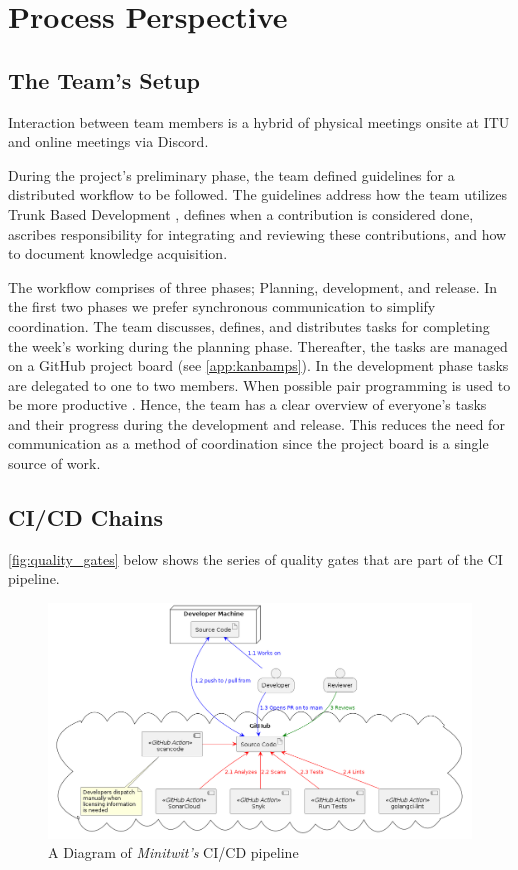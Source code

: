 \section{Process Perspective}

\subsection{The Team's Setup}
Interaction between team members is a hybrid of physical meetings onsite at ITU and online meetings via Discord.  

During the project's preliminary phase, the team defined guidelines for a distributed workflow to be followed. The guidelines address how the team  utilizes Trunk Based Development \cite{trunkdev}, defines when a contribution is considered done, ascribes responsibility for integrating and reviewing these contributions, and how to document knowledge acquisition.

The workflow comprises of three phases; Planning, development, and release.
In the first two phases we prefer synchronous communication to simplify coordination.
The team discusses, defines, and distributes tasks for completing the week's working during the planning phase.
Thereafter, the tasks are managed on a GitHub project board (see \autoref{app:kanbamps}).
In the development phase tasks are delegated to one to two members.
When possible pair programming is used to be more productive \cite{strengthcasepairprog}.
Hence, the team has a clear overview of everyone's tasks and their progress during the development and release.
This reduces the need for communication as a method of coordination since the project board is a single source of work.

\subsection{CI/CD Chains}
\autoref{fig:quality_gates} below shows the series of quality gates that are part of the CI pipeline.

\begin{figure}[H]
    \centering
    \includegraphics[scale=0.35]{images/cicd/quality_gates.png}
    \caption{A Diagram of \textit{Minitwit's} CI/CD pipeline}
    \label{fig:quality_gates}
\end{figure}

